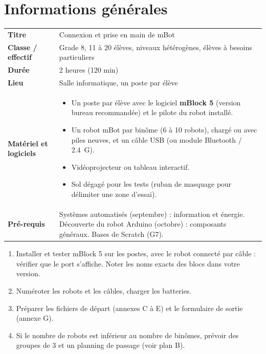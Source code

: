 \documentclass[11pt,a4paper]{article}
\begin{document}

\section{Informations générales}
\begin{tabularx}{\linewidth}{>{\bfseries}p{3.6cm}Y}
\toprule
Titre & Connexion et prise en main de mBot\\
Classe / effectif & Grade 8, 11 à 20 élèves, niveaux hétérogènes, élèves à besoins particuliers\\
Durée & 2 heures (120 min)\\
Lieu & Salle informatique, un poste par élève\\
Matériel et logiciels &
\begin{itemize}
 \item Un poste par élève avec le logiciel \textbf{mBlock 5} (version bureau recommandée) et le pilote du robot installé.
 \item Un robot mBot par binôme (6 à 10 robots), chargé ou avec piles neuves, et un câble USB (ou module Bluetooth / 2.4~G).
 \item Vidéoprojecteur ou tableau interactif.
 \item Sol dégagé pour les tests (ruban de masquage pour délimiter une zone d'essai).
\end{itemize}\\
Pré-requis &
Systèmes automatisés (septembre) : information et énergie. Découverte du robot Arduino (octobre) : composants généraux. Bases de Scratch (G7).\\
\bottomrule
\end{tabularx}

\begin{astuce}
\begin{enumerate}
 \item Installer et tester mBlock 5 sur les postes, avec le robot connecté par câble : vérifier que le port s'affiche. Noter les noms exacts des blocs dans votre version.
 \item Numéroter les robots et les câbles, charger les batteries.
 \item Préparer les fichiers de départ (annexes C à E) et le formulaire de sortie (annexe G).
 \item Si le nombre de robots est inférieur au nombre de binômes, prévoir des groupes de 3 et un planning de passage (voir plan B).
\end{enumerate}
\end{astuce}
\end{document}
